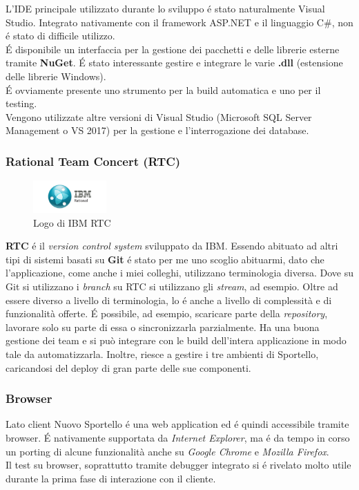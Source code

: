 L'IDE principale utilizzato durante lo sviluppo é stato naturalmente Visual Studio. Integrato nativamente con il framework ASP.NET e il linguaggio C\#, non é stato di difficile utilizzo. \\ É disponibile un interfaccia per la gestione dei pacchetti e delle librerie esterne tramite \textbf{NuGet}. É stato interessante gestire e integrare le varie \textbf{.dll} (estensione delle librerie Windows). \\ É ovviamente presente uno strumento per la build automatica e uno per il testing. \\
Vengono utilizzate altre versioni di Visual Studio (Microsoft SQL Server Management o VS 2017) per la gestione e l'interrogazione dei database.

\subsubsection{Rational Team Concert (RTC)}

\begin{figure}
    \begin{center}
        \includegraphics[width=0.25\textwidth]{./res/img/1-IBM-rational-1.png}
        \caption{Logo di IBM RTC}
    \end{center}
\end{figure}

\textbf{RTC} é il \textit{version control system} sviluppato da IBM. Essendo abituato ad altri tipi di sistemi basati su \textbf{Git} é stato per me uno scoglio abituarmi, dato che l'applicazione, come anche i miei colleghi, utilizzano terminologia diversa. Dove su Git si utilizzano i \textit{branch} su RTC si utilizzano gli \textit{stream}, ad esempio. Oltre ad essere diverso a livello di terminologia, lo é anche a livello di complessità e di funzionalità offerte. É possibile, ad esempio, scaricare parte della \textit{repository}, lavorare solo su parte di essa o sincronizzarla parzialmente. Ha una buona gestione dei team e si può integrare con le build dell'intera applicazione in modo tale da automatizzarla. Inoltre, riesce a gestire i tre ambienti di Sportello, caricandosi del deploy di gran parte delle sue componenti. 

\subsubsection{Browser}
Lato client Nuovo Sportello é una web application ed é quindi accessibile tramite browser. É nativamente supportata da \textit{Internet Explorer}, ma é da tempo in corso un porting di alcune funzionalità anche su \textit{Google Chrome} e \textit{Mozilla Firefox}. \\
Il test su browser, soprattutto tramite debugger integrato si é rivelato molto utile durante la prima fase di interazione con il cliente. 

